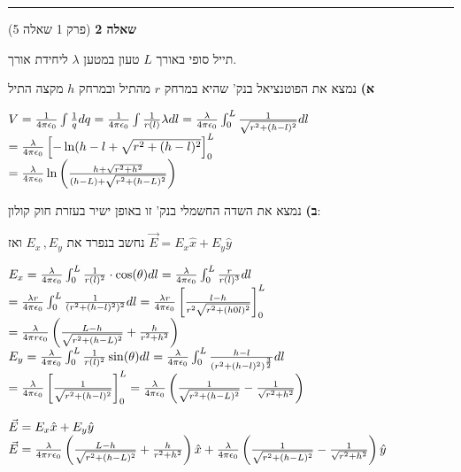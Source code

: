 \documentclass[14pt]{extarticle}
\makeatletter
\newenvironment{lefteqs}{%
    \begin{english}%
    \begin{flushleft}%
    \renewcommand{\arraystretch}{1.3}%
    $\begin{array}{@{}l@{}}%
}{%
    \end{array}$%
    \end{flushleft}%
    \end{english}%
}
\makeatother
\begin{document}
\vspace{3em}
\hrule
\vspace{2em}

\textbf{\large שאלה 2}
(פרק 1 שאלה 5)

תייל סופי באורך $L$ טעון במטען $\lambda$ ליחידת אורך.

\textbf{א)} 
נמצא את הפוטנציאל בנק' שהיא במרחק $r$ מהתיל ובמרחק $h$ מקצה התיל

\begin{lefteqs}
    V=\frac{1}{4\pi \epsilon_0} \int \frac{1}{q} dq = \frac{1}{4\pi \epsilon_0} \int \frac{1}{r(l)} \lambda dl
    = \frac{\lambda}{4\pi \epsilon_0} \int_0^L \frac{1}{\sqrt{r^2 + (h-l)^2}} dl \\
    = \frac{\lambda}{4\pi \epsilon_0} \left[ -\ln(h-l+\sqrt{r^2+(h-l)^2} \right]_0^L \\
    = \frac{\lambda}{4\pi \epsilon_0} \ln\left( \frac{h+\sqrt{r^2+h^2}}{(h-L)+\sqrt{r^2+(h-L)^2}} \right)
\end{lefteqs}

\textbf{ב)} 
נמצא את השדה החשמלי בנק' זו באופן ישיר בעזרת חוק קולון:

נחשב בנפרד את $E_x \, , E_y$ ואז $\vec{E}=E_x \hat{x}  + E_y \hat{y}$

\begin{lefteqs}
    E_x = \frac{\lambda}{4\pi \epsilon_0} \int_0^L \frac{1}{r(l)^2} \cdot \cos(\theta) dl = 
    \frac{\lambda}{4\pi \epsilon_0} \int_0^L \frac{r}{r(l)^3} dl \\
    = \frac{\lambda r}{4\pi \epsilon_0} \int_0^L \frac{1}{(r^2+(h-l)^2)^2} dl
    = \frac{\lambda r}{4\pi \epsilon_0} \left[ \frac{l-h}{r^2\sqrt{r^2+(h0l)^2}} \right]_0^L  \\
    = \frac{\lambda}{4\pi r \epsilon_0} \left( \frac{L-h}{\sqrt{r^2+(h-L)^2}} + \frac{h}{r^2+h^2} \right) \\
    E_y = \frac{\lambda}{4\pi \epsilon_0} \int_0^L \frac{1}{r(l)^2} \sin(\theta) dl
    = \frac{\lambda}{4\pi \epsilon_0} \int_0^L \frac{h-l}{(r^2+(h-l)^2)^{\frac{3}{2}}} dl \\
    = \frac{\lambda}{4\pi \epsilon_0} \left[ \frac{1}{\sqrt{r^2+(h-l)^2}} \right]_0^L
    = \frac{\lambda}{4\pi \epsilon_0} \left( \frac{1}{\sqrt{r^2+(h-L)^2}} - \frac{1}{\sqrt{r^2+h^2}} \right) \\
    \\
    \vec{E} = E_x \hat{x} + E_y \hat{y} \\
    \vec{E} = \frac{\lambda}{4\pi r \epsilon_0} \left( \frac{L-h}{\sqrt{r^2+(h-L)^2}} + \frac{h}{r^2+h^2} \right) \hat{x} + \frac{\lambda}{4\pi \epsilon_0} \left( \frac{1}{\sqrt{r^2+(h-L)^2}} - \frac{1}{\sqrt{r^2+h^2}} \right) \hat{y}

\end{lefteqs}
\end{document}
